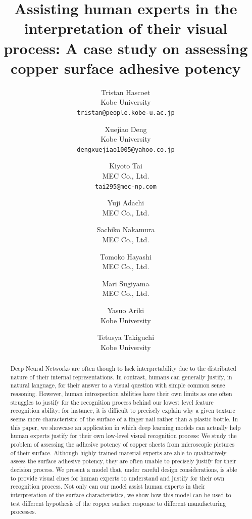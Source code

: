\documentclass[10pt,twocolumn,letterpaper]{article}
\begin{document}
	
	\title{Assisting human experts in the interpretation of their visual process: A case study on assessing copper surface adhesive potency}%
	
	\author{
		Tristan Hascoet\\
		Kobe University\\
		{\tt\small tristan@people.kobe-u.ac.jp}
		\and
		Xuejiao Deng\\
		Kobe University\\
		{\tt\small dengxuejiao1005@yahoo.co.jp}
		\and
		Kiyoto Tai\\
		MEC Co., Ltd.\\
		{\tt\small tai295@mec-np.com}
		\and
		Yuji Adachi \\
		MEC Co., Ltd. \\
		\and
		Sachiko Nakamura\\
		MEC Co., Ltd.\\
		\and
		Tomoko Hayashi\\
		MEC Co., Ltd.\\
		\and
		Mari Sugiyama\\
		MEC Co., Ltd.\\
		\and
		Yasuo Ariki\\
		Kobe University\\
		\and
		Tetusya Takiguchi\\
		Kobe University\\
	}
	
	\maketitle
	
	
\begin{abstract}
Deep Neural Networks are often though to lack interpretability due to the distributed nature of their internal representations. 
In contrast, humans can generally justify, in natural language, for their answer to a visual question with simple common sense reasoning. 
However, human introspection abilities have their own limits as one often struggles to justify for the recognition process behind our lowest level feature recognition ability: 
for instance, it is difficult to precisely explain why a given texture seems more characteristic of the surface of a finger nail rather than a plastic bottle.
In this paper, we showcase an application in which deep learning models can actually  help human experts justify for their own low-level visual recognition process: 
We study the problem of assessing the adhesive potency of copper sheets from microscopic pictures of their surface. 
Although highly trained material experts are able to qualitatively assess the surface adhesive potency, 
they are often unable to precisely justify for their decision process. 
We present a model that, under careful design considerations, 
is able to provide visual clues for human experts to understand and justify for their own recognition process. 
Not only can our model assist human experts in their interpretation of the surface characteristics, 
we show how this model can be used to test different hypothesis of the copper surface response to different manufacturing processes. 
\end{abstract}
	
\end{document}
